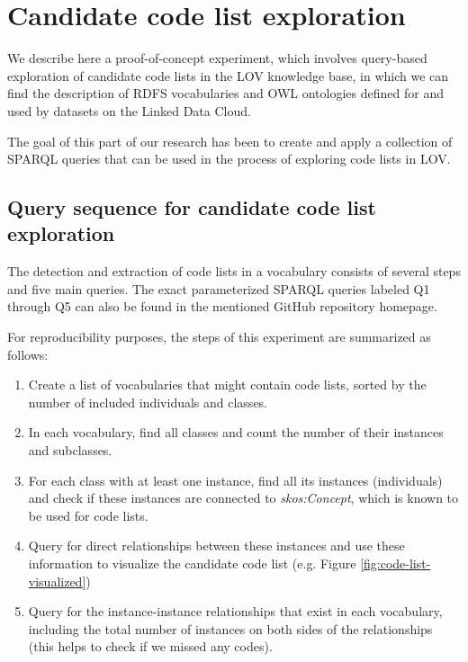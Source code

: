 \section{Candidate code list exploration} 
\label{s:codelistanalyzer}

We describe here a proof-of-concept experiment, which involves query-based exploration of candidate code lists in the LOV knowledge base, in which we can find the description of RDFS vocabularies and OWL ontologies defined for and used by datasets on the Linked Data Cloud.

The goal of this part of our research has been to create and apply a collection of SPARQL queries that can be used in the process of exploring code lists in LOV. %

\subsection{Query sequence for candidate code list exploration}
The detection and extraction of code lists in a vocabulary consists of several steps and five main queries. The exact parameterized SPARQL queries labeled Q1 through Q5 can also be found in the mentioned GitHub repository homepage.

For reproducibility purposes, the steps of this experiment are summarized as follows:

\begin{enumerate}
    \item Create a list of vocabularies that might contain code lists, sorted by the number of included individuals and classes.

    \item In each vocabulary, find all classes and count the number of their instances and subclasses.

    \item For each class with at least one instance, find all its instances (individuals) and check if these instances are connected to \emph{skos:Concept}, which is known to be used for code lists.

    \item Query for direct relationships between these instances and use these information to visualize the candidate code list (e.g. Figure \ref{fig:code-list-visualized})

    \item Query for the instance-instance relationships that exist in each vocabulary, including the total number of instances on both sides of the relationships (this helps to check if we missed any codes).

\end{enumerate}

